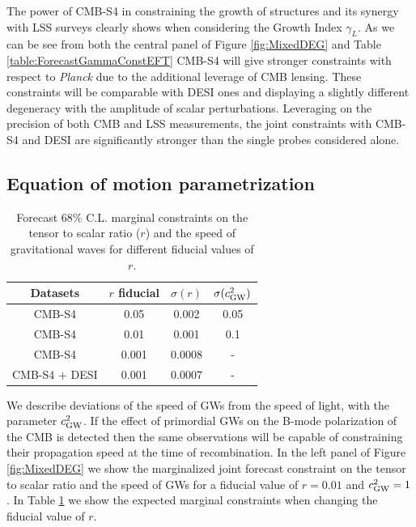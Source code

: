 The power of CMB-S4 in constraining the growth of structures and its synergy with LSS surveys clearly shows when considering the Growth Index $\gamma_{L}$. As we can be see from both the central panel of Figure \ref{fig:MixedDEG} and Table \ref{table:ForecastGammaConstEFT} CMB-S4 will give stronger constraints with respect to {\it Planck} due to the additional leverage of CMB lensing. These constraints will be comparable with DESI ones and displaying a slightly different degeneracy with the amplitude of scalar perturbations.
Leveraging on the precision of both CMB and LSS measurements, the joint constraints with CMB-S4 and DESI are significantly stronger than the single probes considered alone.

\subsection{Equation of motion parametrization}

\begin{table}[t!]
\begin{center}
\begin{tabular}{|c|c|c|c|} 
\hline
Datasets 			&  $r$ fiducial & $\sigma ( r )$  & $\sigma ( c_{\rm GW}^2 )$ \\
\hline
\hline
CMB-S4               & 0.05 & 0.002 & 0.05 \\
\hline
CMB-S4               & 0.01 & 0.001 & 0.1 \\
\hline
CMB-S4               & 0.001 & 0.0008 & - \\
\hline
CMB-S4 + DESI     & 0.001 & 0.0007 & - \\
\hline
\end{tabular}
\caption{Forecast $68\%$ C.L. marginal constraints on the tensor to scalar ratio ($r$) and the speed of gravitational waves for different fiducial values of $r$.}
\label{table:ForecastCT}
\end{center}
\end{table}

We describe deviations of the speed of GWs from the speed of light, with the parameter $c^2_{\rm GW}$. If the effect of primordial GWs on the B-mode polarization of the CMB is detected then the same observations will be capable of constraining their propagation speed at the time of recombination.
In the left panel of Figure \ref{fig:MixedDEG} we show the marginalized joint forecast constraint on the tensor to scalar ratio and the speed of GWs for a fiducial value of $r=0.01$ and $c_{\rm GW}^2=1$. In Table \ref{table:ForecastCT} we show the expected marginal constraints when changing the fiducial value of $r$.

